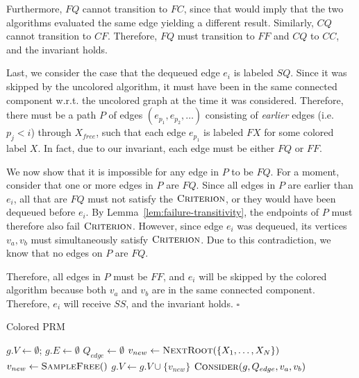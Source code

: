 \documentclass{report}
\newenvironment{proof}[1][Proof]{\begin{trivlist}
   \item[\hskip \labelsep {\bfseries #1}]}{\hfill$\square$\end{trivlist}}
\begin{document}
\begin{proof}
Furthermore, $FQ$ cannot transition to $FC$, since that would imply
that the two algorithms evaluated the same edge yielding a different result.
Similarly, $CQ$ cannot transition to $CF$.
Therefore, $FQ$ must transition to $FF$
and $CQ$ to $CC$,
and the invariant holds.

Last, we consider the case that the dequeued edge
$e_i$ is labeled $SQ$.
Since it was skipped by the uncolored algorithm,
it must have been in the same connected component w.r.t. the uncolored
graph at the time it was considered.
Therefore, there must be a path $P$ of edges $(e_{p_1}, e_{p_2}, \dots)$
consisting of \emph{earlier} edges (i.e. $p_j < i$)
through $X_{free}$, such that each edge $e_{p_1}$ is labeled $FX$
for some colored label $X$.
In fact, due to our invariant, each edge must be either $FQ$ or $FF$.

We now show that it is impossible for any edge in $P$ to be $FQ$.
For a moment, consider that one or more edges in $P$ are $FQ$.
Since all edges in $P$ are earlier than $e_i$,
all that are $FQ$ must not satisfy the $\textsc{Criterion}$,
or they would have been dequeued before $e_i$.
By Lemma~\ref{lem:failure-transitivity},
the endpoints of $P$ must therefore also fail $\textsc{Criterion}$.
However, since edge $e_i$ was dequeued,
its vertices $v_a, v_b$ must simultaneously satisfy $\textsc{Criterion}$.
Due to this contradiction, we know that no edges on $P$ are $FQ$.

Therefore, all edges in $P$ must be $FF$,
and $e_i$ will be skipped by the colored algorithm
because both $v_a$ and $v_b$ are in the same connected component.
Therefore, $e_i$ will receive $SS$, and the invariant holds.
\end{proof}

\begin{algorithm*}[t]
\caption{Colored PRM}
\begin{algorithmic}[1]
\State $g.V \leftarrow \emptyset$; $g.E \leftarrow \emptyset$
\State $Q_{edge} \leftarrow \emptyset$
   \label{line:empty-queue}%
   \label{line:roots-not-added}%
\State $v_{new} \leftarrow \mbox{\textsc{NextRoot}}(\{X_1, \dots, X_N\})$
   \label{line:add-root}%
\Else
\State $v_{new} \leftarrow \mbox{\textsc{SampleFree}}()$
   \label{line:sample}%
\EndIf
\State $g.V \leftarrow g.V \cup \{ v_{new} \}$
   \label{line:island-add}%
   \label{line:nearby}%
\State $\mbox{\textsc{Consider}}(g, Q_{edge}, v_a, v_b)$%
   \label{line:consider}%
\EndFor
\EndWhile
\EndProcedure
\end{algorithmic}
\label{alg:colored-prm}
\end{algorithm*}
\end{document}
